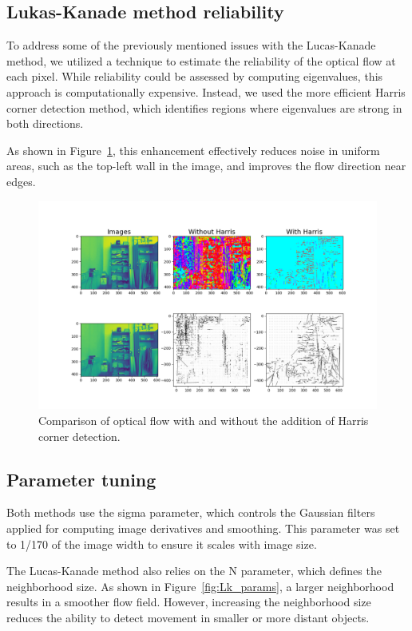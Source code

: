 \documentclass[9pt]{IEEEtran}
\begin{document}
\subsection{Lukas-Kanade method reliability}
To address some of the previously mentioned issues with the Lucas-Kanade method, we utilized a
 technique to estimate the reliability of the optical flow at each pixel. While reliability 
 could be assessed by computing eigenvalues, this approach is computationally expensive. Instead, 
 we used the more efficient Harris corner detection method, which identifies regions where eigenvalues 
 are strong in both directions.

As shown in Figure~\ref{fig:harris}, this enhancement effectively reduces noise in uniform areas, 
such as the top-left wall in the image, and improves the flow direction near edges.

\begin{figure}[h]
    \centering
    \includegraphics[width=1\columnwidth]{figures/harris_addition.png}
    \caption{Comparison of optical flow with and without the addition of Harris corner detection.}
    \label{fig:harris}
\end{figure}

\subsection{Parameter tuning}
Both methods use the sigma parameter, which controls the Gaussian filters applied for computing image 
derivatives and smoothing. This parameter was set to 1/170 of the image width to ensure it scales with 
image size.

The Lucas-Kanade method also relies on the N parameter, which defines the neighborhood size. As 
shown in Figure~\ref{fig:Lk_params}, a larger neighborhood results in a smoother flow field. However, 
increasing the neighborhood size reduces the ability to detect movement in smaller or more distant objects.
\end{document}
